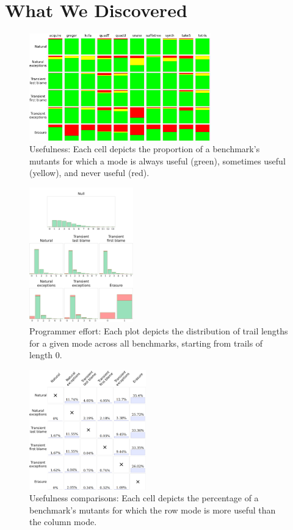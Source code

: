 \section{What We Discovered}

\begin{figure}
  \centering
  \includegraphics[width=0.7\textwidth]{./plots/usefulness-table}
  \caption{Usefulness: Each cell depicts the proportion of a benchmark's mutants for which a mode is always useful (green), sometimes useful (yellow), and never useful (red).}
  \label{fig:usefulness-table}
\end{figure}

\begin{figure}
  \centering
  \includegraphics[width=0.4\textwidth]{./plots/bt-lengths-table}
  \caption{Programmer effort: Each plot depicts the distribution of trail
  lengths for a given mode across all benchmarks, starting from trails
  of length 0.}
  \label{fig:effort-table}
\end{figure}

\begin{figure}
  \centering
  \includegraphics[width=0.45\textwidth]{./plots/avo-matrix}
  \caption{Usefulness comparisons: Each cell depicts the percentage of a
  benchmark's mutants for which the row mode is more useful than the column mode.}
  \label{fig:avo-matrix}
\end{figure}

